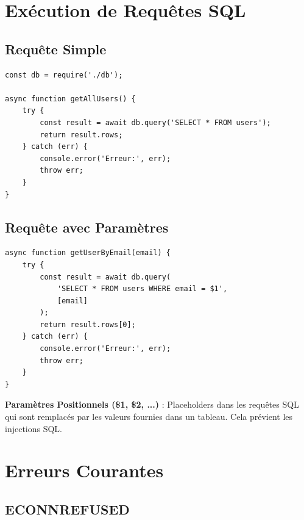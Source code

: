 \section{Exécution de Requêtes SQL}

\subsection{Requête Simple}

\begin{lstlisting}[style=javascript, caption=Exécution d'une requête simple]
const db = require('./db');

async function getAllUsers() {
    try {
        const result = await db.query('SELECT * FROM users');
        return result.rows;
    } catch (err) {
        console.error('Erreur:', err);
        throw err;
    }
}
\end{lstlisting}

\subsection{Requête avec Paramètres}

\begin{lstlisting}[style=javascript, caption=Requête avec paramètres (recommandé)]
async function getUserByEmail(email) {
    try {
        const result = await db.query(
            'SELECT * FROM users WHERE email = $1',
            [email]
        );
        return result.rows[0];
    } catch (err) {
        console.error('Erreur:', err);
        throw err;
    }
}
\end{lstlisting}

\begin{definitionbox}
    \textbf{Paramètres Positionnels (\$1, \$2, ...)} : Placeholders dans les requêtes SQL qui sont remplacés par les valeurs fournies dans un tableau. Cela prévient les injections SQL.
\end{definitionbox}

\section{Erreurs Courantes}

\subsection{ECONNREFUSED}

